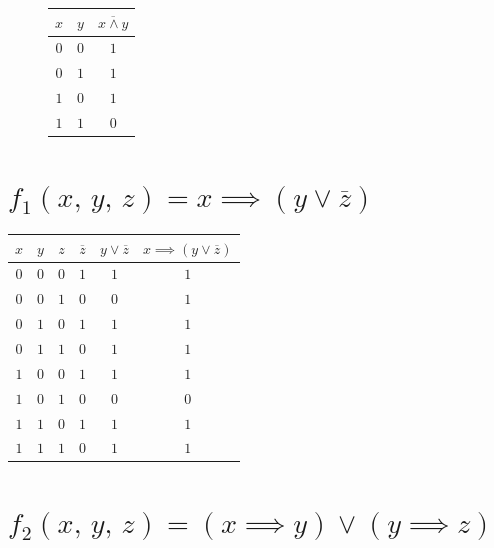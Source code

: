\documentclass[12pt,a4paper]{article}
\theoremstyle{plain}
\theoremstyle{definition}
\theoremstyle{remark}
\numberwithin{equation}{section}
\begin{document}
\begin{figure}[H]
\begin{minipage}[t]{0.05\textwidth}
    \resizebox{\textwidth}{\textwidth}{$\equiv$}
  \end{minipage} \hfill
  \begin{minipage}[t]{0.27\textwidth}
    \vspace{0em}
    \begin{tabularx}{\linewidth}{|C|C|C C|}
      \hline
      $x$ & $y$ &  \\
      \hline
      $0$ & $0$ &  \\
      $0$ & $1$ &  \\
      $1$ & $0$ &  \\
      $1$ & $1$ &  \\
      \hline
    \end{tabularx}
  \end{minipage}
\end{figure}

\section{$f_1(x,\,y,\,z) = x \implies (y \lor \overline{z})$}

\begin{tabularx}{0.38\textwidth}{|c|c|c|c|c|C|}
  \hline
  $x$ & $y$ & $z$ & $\overline{z}$ & $y \lor \overline{z}$ & $x \implies (y \lor \overline{z})$ \\
  \hline
  $0$ & $0$ & $0$ & $1$ & $1$ & $1$ \\
  $0$ & $0$ & $1$ & $0$ & $0$ & $1$ \\  
  $0$ & $1$ & $0$ & $1$ & $1$ & $1$ \\
  $0$ & $1$ & $1$ & $0$ & $1$ & $1$ \\
  $1$ & $0$ & $0$ & $1$ & $1$ & $1$ \\
  $1$ & $0$ & $1$ & $0$ & $0$ & $0$ \\
  $1$ & $1$ & $0$ & $1$ & $1$ & $1$ \\
  $1$ & $1$ & $1$ & $0$ & $1$ & $1$ \\
  \hline  
\end{tabularx}

\section{$f_2(x,\,y,\,z) = (x \implies y) \lor (y \implies z)$}
\end{document}
